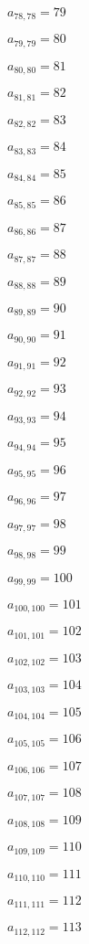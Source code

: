 \documentclass[a4paper,12pt]{article}
\begin{document}
$a _{ 78, 78 } = 79$

$a _{ 79, 79 } = 80$

$a _{ 80, 80 } = 81$

$a _{ 81, 81 } = 82$

$a _{ 82, 82 } = 83$

$a _{ 83, 83 } = 84$

$a _{ 84, 84 } = 85$

$a _{ 85, 85 } = 86$

$a _{ 86, 86 } = 87$

$a _{ 87, 87 } = 88$

$a _{ 88, 88 } = 89$

$a _{ 89, 89 } = 90$

$a _{ 90, 90 } = 91$

$a _{ 91, 91 } = 92$

$a _{ 92, 92 } = 93$

$a _{ 93, 93 } = 94$

$a _{ 94, 94 } = 95$

$a _{ 95, 95 } = 96$

$a _{ 96, 96 } = 97$

$a _{ 97, 97 } = 98$

$a _{ 98, 98 } = 99$

$a _{ 99, 99 } = 100$

$a _{ 100, 100 } = 101$

$a _{ 101, 101 } = 102$

$a _{ 102, 102 } = 103$

$a _{ 103, 103 } = 104$

$a _{ 104, 104 } = 105$

$a _{ 105, 105 } = 106$

$a _{ 106, 106 } = 107$

$a _{ 107, 107 } = 108$

$a _{ 108, 108 } = 109$

$a _{ 109, 109 } = 110$

$a _{ 110, 110 } = 111$

$a _{ 111, 111 } = 112$

$a _{ 112, 112 } = 113$
\end{document}
